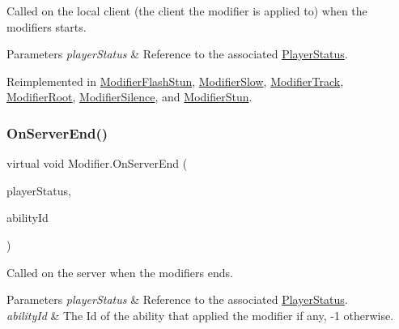Called on the local client (the client the modifier is applied to) when the modifiers starts. 


\begin{DoxyParams}{Parameters}
{\em player\+Status} & Reference to the associated \hyperlink{class_player_status}{Player\+Status}.\\
\hline
\end{DoxyParams}


Reimplemented in \hyperlink{class_modifier_flash_stun_a27c1f1560db77c6ea9f32655113392b7}{Modifier\+Flash\+Stun}, \hyperlink{class_modifier_slow_a1eef9ea247bc45bf06b4c56c1a4803d0}{Modifier\+Slow}, \hyperlink{class_modifier_track_ab3fb34a4d5f468634ab90837fd4cc3ad}{Modifier\+Track}, \hyperlink{class_modifier_root_a4905c6533e50d82cb9ffad1eda6c076e}{Modifier\+Root}, \hyperlink{class_modifier_silence_a46d7fc89d95ab9e45013d79949254288}{Modifier\+Silence}, and \hyperlink{class_modifier_stun_a2798f3de724e40e72bbc203b6aece7e5}{Modifier\+Stun}.

\hypertarget{class_modifier_ac14e32bd10e59e29c63c01cc52db7ace}{}\label{class_modifier_ac14e32bd10e59e29c63c01cc52db7ace} 
\subsubsection{\texorpdfstring{On\+Server\+End()}{OnServerEnd()}}
{\footnotesize\ttfamily virtual void Modifier.\+On\+Server\+End (\begin{DoxyParamCaption}\item[{\hyperlink{class_player_status}{Player\+Status}}]{player\+Status,  }\item[{int}]{ability\+Id }\end{DoxyParamCaption})\hspace{0.3cm}{\ttfamily [virtual]}}



Called on the server when the modifiers ends. 


\begin{DoxyParams}{Parameters}
{\em player\+Status} & Reference to the associated \hyperlink{class_player_status}{Player\+Status}.\\
\hline
{\em ability\+Id} & The Id of the ability that applied the modifier if any, -\/1 otherwise.\\
\hline
\end{DoxyParams}
\hypertarget{class_modifier_ae54219588440fc4e2edfdb59c283c9b2}{}\label{class_modifier_ae54219588440fc4e2edfdb59c283c9b2} 
